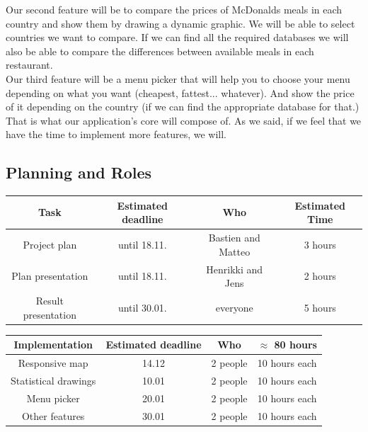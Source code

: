 \documentclass[12pt]{article}
\begin{document}
        \noindent Our second feature will be to compare the prices of McDonalds meals
        in each country and show them by drawing a dynamic graphic. We will be
        able to select countries we want to compare. If we can find all the
        required databases we will also be able to compare the differences
        between available meals in each restaurant.\\

        \noindent Our third feature will be a menu picker that will help you to choose
        your menu depending on what you want (cheapest, fattest... whatever).
        And show the price of it depending on the country (if we can find the
        appropriate database for that.)\\

        \noindent That is what our application's core will compose of. As we said, if we feel
        that we have the time to implement more features, we will.

        \newpage

        {\color{color_subsection}\subsection{Planning and Roles}}
        \vspace{1em}
           
	\begin{center}
	    \begin{tabular}{ |c|c|c|c| } 
 	        \hline
	        \textbf{Task} & \textbf{Estimated deadline} & \textbf{Who} & \textbf{Estimated Time}  \\
	        \hline
 	        Project plan & until 18.11. & Bastien and Matteo & 3 hours \\ 
 	        \hline
 	        Plan presentation & until 18.11. & Henrikki and Jens & 2 hours \\
            \hline 
            Result presentation & until 30.01. & everyone & 5 hours \\ 
            \hline 
        \end{tabular}
    \end{center}
    
    \begin{center}
        \begin{tabular}{ |c|c|c|c| } 
            \hline
            \textbf{Implementation} & \textbf{Estimated deadline} & \textbf{Who} & \textbf{$\approx$ 80 hours} \\
            \hline
            Responsive map & 14.12 & 2 people & 10 hours each \\
            \hline
 	        Statistical drawings & 10.01 & 2 people & 10 hours each\\  
            \hline
            Menu picker & 20.01 & 2 people & 10 hours each \\
            \hline
            Other features & 30.01 & 2 people & 10 hours each \\
	        \hline
	    \end{tabular}
    \end{center}
    
\end{document}

